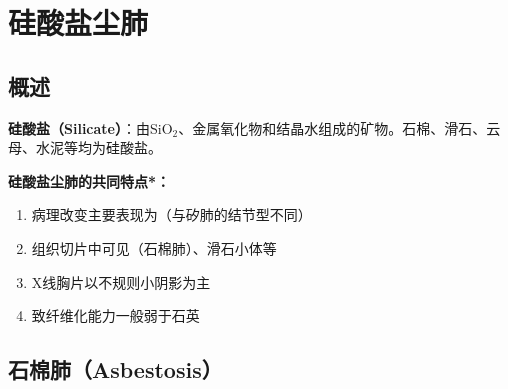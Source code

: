 \section{硅酸盐尘肺}

\subsection{概述}

\begin{defbox}
\textbf{硅酸盐（Silicate）}：由SiO$_2$、金属氧化物和结晶水组成的矿物。石棉、滑石、云母、水泥等均为硅酸盐。

\textbf{硅酸盐尘肺的共同特点*：}
\begin{enumerate}[leftmargin=*]
    \item 病理改变主要表现为（与矽肺的结节型不同）
    \item 组织切片中可见（石棉肺）、滑石小体等
    \item X线胸片以不规则小阴影为主
    \item 致纤维化能力一般弱于石英
\end{enumerate}
\end{defbox}

\subsection{石棉肺（Asbestosis）}

